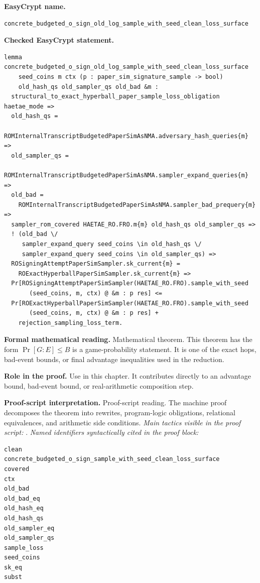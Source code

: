 \begin{formaltheorem}
\noindent\textbf{EasyCrypt name.}
\begin{lstlisting}[language=EasyCrypt,basicstyle=\ttfamily\scriptsize]
concrete_budgeted_o_sign_old_log_sample_with_seed_clean_loss_surface
\end{lstlisting}
\noindent\textbf{Checked EasyCrypt statement.}
\begin{lstlisting}[language=EasyCrypt,basicstyle=\ttfamily\scriptsize]
lemma concrete_budgeted_o_sign_old_log_sample_with_seed_clean_loss_surface
    seed_coins m ctx (p : paper_sim_signature_sample -> bool)
    old_hash_qs old_sampler_qs old_bad &m :
  structural_to_exact_hyperball_paper_sample_loss_obligation haetae_mode =>
  old_hash_qs =
    ROMInternalTranscriptBudgetedPaperSimAsNMA.adversary_hash_queries{m} =>
  old_sampler_qs =
    ROMInternalTranscriptBudgetedPaperSimAsNMA.sampler_expand_queries{m} =>
  old_bad =
    ROMInternalTranscriptBudgetedPaperSimAsNMA.sampler_bad_prequery{m} =>
  sampler_rom_covered HAETAE_RO.FRO.m{m} old_hash_qs old_sampler_qs =>
  ! (old_bad \/
     sampler_expand_query seed_coins \in old_hash_qs \/
     sampler_expand_query seed_coins \in old_sampler_qs) =>
  ROSigningAttemptPaperSimSampler.sk_current{m} =
    ROExactHyperballPaperSimSampler.sk_current{m} =>
  Pr[ROSigningAttemptPaperSimSampler(HAETAE_RO.FRO).sample_with_seed
       (seed_coins, m, ctx) @ &m : p res] <=
  Pr[ROExactHyperballPaperSimSampler(HAETAE_RO.FRO).sample_with_seed
       (seed_coins, m, ctx) @ &m : p res] +
    rejection_sampling_loss_term.
\end{lstlisting}
\noindent\textbf{Formal mathematical reading.}
Mathematical theorem. This theorem has the form \(\Pr[G:E] \le B\) is a game-probability statement.  It is one of the exact hops, bad-event bounds, or final advantage inequalities used in the reduction.

\noindent\textbf{Role in the proof.}
Use in this chapter. It contributes directly to an advantage bound, bad-event bound, or real-arithmetic composition step.

\noindent\textbf{Proof-script interpretation.}
Proof-script reading. The machine proof decomposes the theorem into rewrites, program-logic obligations, relational equivalences, and arithmetic side conditions.
\emph{Main tactics visible in the proof script:} .
\emph{Named identifiers syntactically cited in the proof block:}
\begin{lstlisting}[language=EasyCrypt,basicstyle=\ttfamily\scriptsize]
clean
concrete_budgeted_o_sign_sample_with_seed_clean_loss_surface
covered
ctx
old_bad
old_bad_eq
old_hash_eq
old_hash_qs
old_sampler_eq
old_sampler_qs
sample_loss
seed_coins
sk_eq
subst
\end{lstlisting}

\end{formaltheorem}

